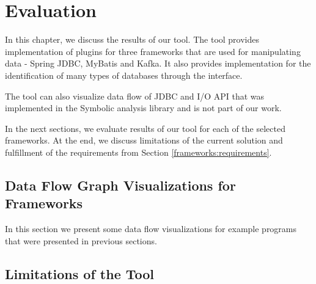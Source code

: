 
\chapter{Evaluation \label{chapter:results}}

In this chapter, we discuss the results of our \ToolName tool.
The tool provides implementation of plugins for three frameworks
that are used for manipulating data - Spring JDBC, MyBatis and Kafka.
It also provides implementation for the identification of many types of databases
through the  interface.

The \ToolName tool can also visualize data flow of JDBC and I/O API that was
implemented in the Symbolic analysis library and is not part of our work.

In the next sections, we evaluate results of our \ToolName tool for each of the selected frameworks.
At the end, we discuss limitations of the current solution and fulfillment of
the requirements from Section \ref{frameworks:requirements}.




\section{Data Flow Graph Visualizations for Frameworks}

In this section we present some data flow visualizations
for example programs that were presented in previous sections.




\section{Limitations of the \ToolName Tool \label{chapter:results:limits}}

